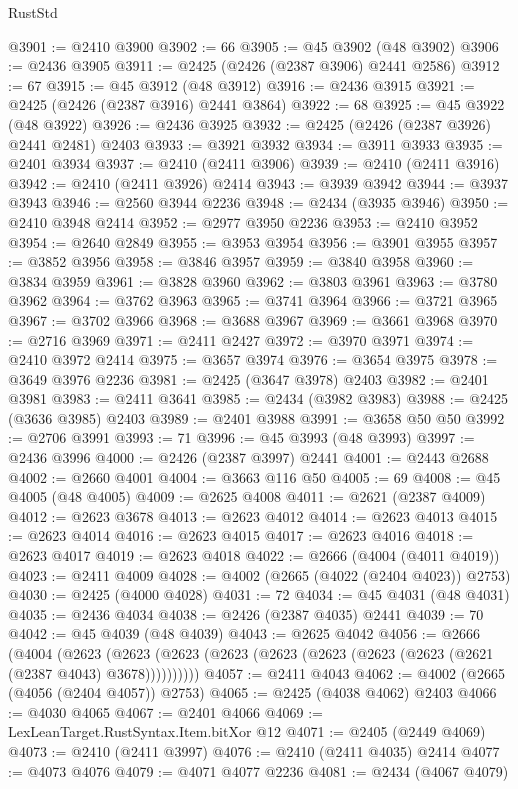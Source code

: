\begin{lexlean}{RustStd}
\begin{coremodule}
@3901 := @2410 @3900
@3902 := 66
@3905 := @45 @3902 (@48 @3902)
@3906 := @2436 @3905
@3911 := @2425 (@2426 (@2387 @3906) @2441 @2586)
@3912 := 67
@3915 := @45 @3912 (@48 @3912)
@3916 := @2436 @3915
@3921 := @2425 (@2426 (@2387 @3916) @2441 @3864)
@3922 := 68
@3925 := @45 @3922 (@48 @3922)
@3926 := @2436 @3925
@3932 := @2425 (@2426 (@2387 @3926) @2441 @2481) @2403
@3933 := @3921 @3932
@3934 := @3911 @3933
@3935 := @2401 @3934
@3937 := @2410 (@2411 @3906)
@3939 := @2410 (@2411 @3916)
@3942 := @2410 (@2411 @3926) @2414
@3943 := @3939 @3942
@3944 := @3937 @3943
@3946 := @2560 @3944 @2236
@3948 := @2434 (@3935 @3946)
@3950 := @2410 @3948 @2414
@3952 := @2977 @3950 @2236
@3953 := @2410 @3952
@3954 := @2640 @2849
@3955 := @3953 @3954
@3956 := @3901 @3955
@3957 := @3852 @3956
@3958 := @3846 @3957
@3959 := @3840 @3958
@3960 := @3834 @3959
@3961 := @3828 @3960
@3962 := @3803 @3961
@3963 := @3780 @3962
@3964 := @3762 @3963
@3965 := @3741 @3964
@3966 := @3721 @3965
@3967 := @3702 @3966
@3968 := @3688 @3967
@3969 := @3661 @3968
@3970 := @2716 @3969
@3971 := @2411 @2427
@3972 := @3970 @3971
@3974 := @2410 @3972 @2414
@3975 := @3657 @3974
@3976 := @3654 @3975
@3978 := @3649 @3976 @2236
@3981 := @2425 (@3647 @3978) @2403
@3982 := @2401 @3981
@3983 := @2411 @3641
@3985 := @2434 (@3982 @3983)
@3988 := @2425 (@3636 @3985) @2403
@3989 := @2401 @3988
@3991 := @3658 @50 @50
@3992 := @2706 @3991
@3993 := 71
@3996 := @45 @3993 (@48 @3993)
@3997 := @2436 @3996
@4000 := @2426 (@2387 @3997) @2441
@4001 := @2443 @2688
@4002 := @2660 @4001
@4004 := @3663 @116 @50
@4005 := 69
@4008 := @45 @4005 (@48 @4005)
@4009 := @2625 @4008
@4011 := @2621 (@2387 @4009)
@4012 := @2623 @3678
@4013 := @2623 @4012
@4014 := @2623 @4013
@4015 := @2623 @4014
@4016 := @2623 @4015
@4017 := @2623 @4016
@4018 := @2623 @4017
@4019 := @2623 @4018
@4022 := @2666 (@4004 (@4011 @4019))
@4023 := @2411 @4009
@4028 := @4002 (@2665 (@4022 (@2404 @4023)) @2753)
@4030 := @2425 (@4000 @4028)
@4031 := 72
@4034 := @45 @4031 (@48 @4031)
@4035 := @2436 @4034
@4038 := @2426 (@2387 @4035) @2441
@4039 := 70
@4042 := @45 @4039 (@48 @4039)
@4043 := @2625 @4042
@4056 := @2666
    (@4004
      (@2623 (@2623 (@2623 (@2623 (@2623 (@2623 (@2623 (@2623 (@2621 (@2387 @4043) @3678))))))))))
@4057 := @2411 @4043
@4062 := @4002 (@2665 (@4056 (@2404 @4057)) @2753)
@4065 := @2425 (@4038 @4062) @2403
@4066 := @4030 @4065
@4067 := @2401 @4066
@4069 := LexLeanTarget.RustSyntax.Item.bitXor @12
@4071 := @2405 (@2449 @4069)
@4073 := @2410 (@2411 @3997)
@4076 := @2410 (@2411 @4035) @2414
@4077 := @4073 @4076
@4079 := @4071 @4077 @2236
@4081 := @2434 (@4067 @4079)

\end{coremodule}
\end{lexlean}
